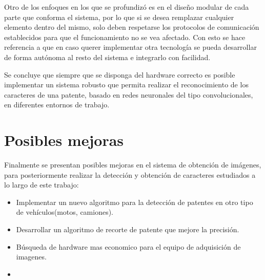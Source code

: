 Otro de los enfoques en los que se profundizó es en el diseño modular de cada parte que conforma el sistema, por lo que si se desea remplazar cualquier elemento dentro del mismo, solo deben respetarse los protocolos de comunicación establecidos para que el funcionamiento no se vea afectado.
Con esto se hace referencia a que en caso querer implementar otra tecnología se pueda desarrollar de forma autónoma al resto del sistema e integrarlo con
facilidad.

Se concluye que siempre que se disponga del hardware correcto es posible implementar un sistema robusto que permita realizar el reconocimiento de los caracteres de una patente, basado en redes neuronales del tipo convolucionales, en diferentes entornos de trabajo.


\section{Posibles mejoras}
Finalmente se presentan posibles mejoras en el sistema de obtención de imágenes, para posteriormente realizar la detección y obtención de caracteres estudiados a lo largo de este trabajo:
\begin{itemize}
    \item Implementar un nuevo algoritmo para la detección de patentes en otro tipo de vehículos(motos, camiones).
    \item Desarrollar un algoritmo de recorte de patente que mejore la precisión.
    \item Búsqueda de hardware mas economico para el equipo de adquisición de imagenes.
    \item 
\end{itemize}
